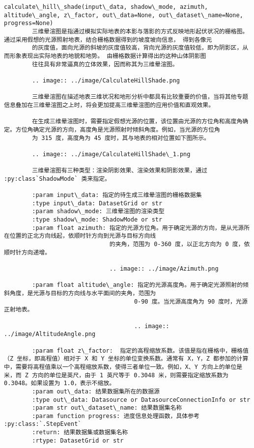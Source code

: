 \documentclass[11pt]{article}
\begin{document}
\begin{Verbatim}[commandchars=\\\{\}]
    calculate\_hill\_shade(input\_data, shadow\_mode, azimuth, altitude\_angle, z\_factor, out\_data=None, out\_dataset\_name=None, progress=None)
        三维晕渲图是指通过模拟实际地表的本影与落影的方式反映地形起伏状况的栅格图。通过采用假想的光源照射地表，结合栅格数据得到的坡度坡向信息， 得到各像元
        的灰度值，面向光源的斜坡的灰度值较高，背向光源的灰度值较低，即为阴影区，从而形象表现出实际地表的地貌和地势。 由栅格数据计算得出的这种山体阴影图
        往往具有非常逼真的立体效果，因而称其为三维晕渲图。
        
        .. image:: ../image/CalculateHillShade.png
        
        三维晕渲图在描述地表三维状况和地形分析中都具有比较重要的价值，当将其他专题信息叠加在三维晕渲图之上时，将会更加提高三维晕渲图的应用价值和直观效果。
        
        在生成三维晕渲图时，需要指定假想光源的位置，该位置由光源的方位角和高度角确定。方位角确定光源的方向，高度角是光源照射时倾斜角度。例如，当光源的方位角
        为 315 度，高度角为 45 度时，其与地表的相对位置如下图所示。
        
        .. image:: ../image/CalculateHillShade\_1.png
        
        三维晕渲图有三种类型：渲染阴影效果、渲染效果和阴影效果，通过 :py:class`ShadowMode` 类来指定。
        
        :param input\_data: 指定的待生成三维晕渲图的栅格数据集
        :type input\_data: DatasetGrid or str
        :param shadow\_mode: 三维晕渲图的渲染类型
        :type shadow\_mode: ShadowMode or str
        :param float azimuth: 指定的光源方位角。用于确定光源的方向，是从光源所在位置的正北方向线起，依顺时针方向到光源与目标方向线
                              的夹角，范围为 0-360 度，以正北方向为 0 度，依顺时针方向递增。
        
                              .. image:: ../image/Azimuth.png
        
        :param float altitude\_angle: 指定的光源高度角。用于确定光源照射的倾斜角度，是光源与目标的方向线与水平面间的夹角，范围为
                                     0-90 度。当光源高度角为 90 度时，光源正射地表。
        
                                     .. image:: ../image/AltitudeAngle.png
        
        :param float z\_factor:  指定的高程缩放系数。该值是指在栅格中，栅格值（Z 坐标，即高程值）相对于 X 和 Y 坐标的单位变换系数。通常有 X，Y，Z 都参加的计算中，需要将高程值乘以一个高程缩放系数，使得三者单位一致。例如，X、Y 方向上的单位是米，而 Z 方向的单位是英尺，由于 1 英尺等于 0.3048 米，则需要指定缩放系数为 0.3048。如果设置为 1.0，表示不缩放。
        :param out\_data: 结果数据集所在的数据源
        :type out\_data: Datasource or DatasourceConnectionInfo or str
        :param str out\_dataset\_name: 结果数据集名称
        :param function progress: 进度信息处理函数，具体参考 :py:class:`.StepEvent`
        :return: 结果数据集或数据集名称
        :rtype: DatasetGrid or str
    

\end{Verbatim}
\end{document}
